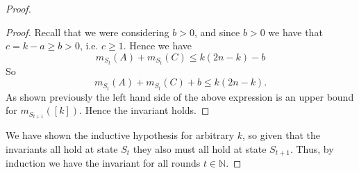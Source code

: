 \documentclass[twocolumn]{article}[10pt]
\DeclareMathOperator{\E}{\mathbb{E}}
\newtheorem{corollary}{Corollary}
\newtheorem{theorem}{Theorem}
\begin{document}
\begin{proof}
\begin{proof}
Recall that we were considering $b> 0$, and since $b>0$ we have that $c = k-a
\ge b > 0$, i.e. $c \ge 1$. 
Hence we have 
$$m_{S_t}(A) + m_{S_t}(C) \le k(2n-k) -b$$
So 
$$m_{S_t}(A) + m_{S_t}(C)+b \le k(2n-k).$$
As shown previously the left hand side of the above expression is an upper
bound for $m_{S_{t+1}}([k])$.
Hence the invariant holds.
  
\end{proof}

We have shown the inductive hypothesis for arbitrary $k$, so given that the
invariants all hold at state $S_t$ they also must all hold at state $S_{t+1}$.
Thus, by induction we have the invariant for all rounds $t\in\mathbb{N}$.
\end{proof}



\end{document}
